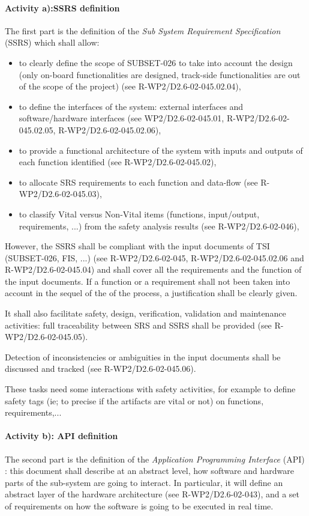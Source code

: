 \paragraph{Activity a):SSRS definition} The first part is the definition of the  \emph{Sub System Requirement Specification} (SSRS) which shall allow:
\begin{itemize}
\item to clearly define the scope of SUBSET-026 to take into account the design (only on-board functionalities are designed, track-side functionalities are out of the scope of the project) (see R-WP2/D2.6-02-045.02.04),
\item to define the interfaces of the system: external interfaces and software/hardware interfaces (see WP2/D2.6-02-045.01, R-WP2/D2.6-02-045.02.05, R-WP2/D2.6-02-045.02.06),
\item to provide a functional architecture of the system with inputs and outputs of each function identified (see R-WP2/D2.6-02-045.02),
\item to allocate SRS requirements to each function and data-flow (see R-WP2/D2.6-02-045.03),
\item to classify Vital versus Non-Vital items (functions, input/output, requirements, ...) from the safety analysis results (see R-WP2/D2.6-02-046),
\end{itemize}

However, the SSRS shall be compliant with the input documents of TSI (SUBSET-026, FIS, ...) (see R-WP2/D2.6-02-045, R-WP2/D2.6-02-045.02.06 and R-WP2/D2.6-02-045.04) and shall cover all the requirements and the function of the input documents. If a function or a requirement shall not been taken into account in the sequel of the of the process, a justification shall be clearly given.

It shall also facilitate safety, design, verification, validation and maintenance activities: full traceability between SRS and SSRS shall be provided (see R-WP2/D2.6-02-045.05).

Detection of inconsistencies or ambiguities in the input documents shall be discussed and tracked (see R-WP2/D2.6-02-045.06).

These tasks need some interactions with safety activities, for example to define safety tags (ie; to precise if the artifacts are vital or not) on functions, requirements,...

\paragraph{Activity b): API definition} The second part is the definition of the \textit{Application Programming Interface} (API) : this document shall describe at an abstract level, how software and hardware parts of the sub-system are going to interact.
In particular, it will define an abstract layer of the hardware architecture (see R-WP2/D2.6-02-043), and a set of requirements on how the software is going to be executed in real time.

